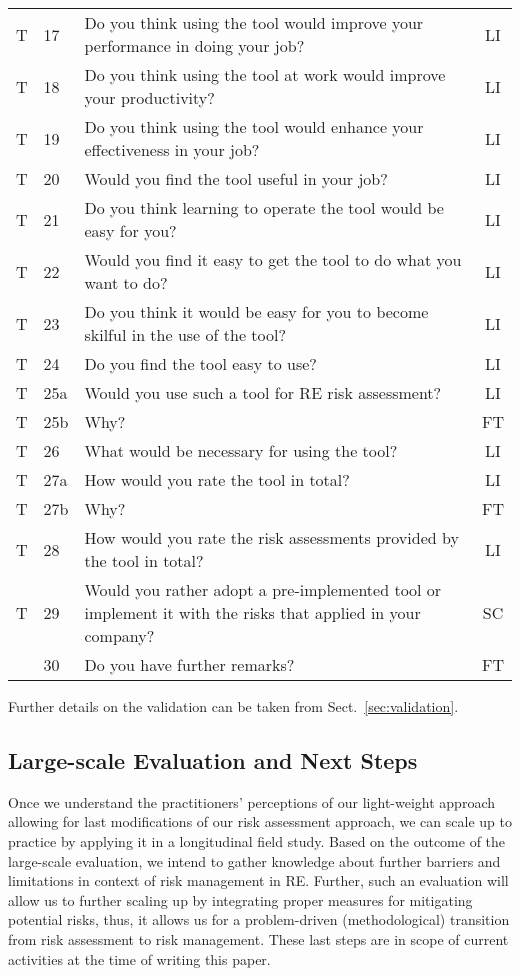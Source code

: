 \documentclass[lnbip]{svmultln}
\begin{document}
\begin{table}[htb]
\begin{tabular}{clp{10.4cm}c}
	T & 17 & Do you think using the tool would improve your performance in doing your job?  & LI  \\ 
	T & 18 & Do you think using the tool at work would improve your productivity? &  LI \\ 
	T & 19 & Do you think using the tool would enhance your effectiveness in your job? & LI  \\ 
	T & 20 & Would you find the tool useful in your job? & LI  \\ 
	T & 21 & Do you think learning to operate the tool would be easy for you?  & LI  \\ 
	T & 22 & Would you find it easy to get the tool to do what you want to do? &  LI \\ 
	T & 23 & Do you think it would be easy for you to become skilful in the use of the tool?  & LI  \\ 
	T & 24 & Do you find the tool easy to use? & LI  \\ 
	T & 25a & Would you use such a tool for RE risk assessment?  &  LI \\ 
	T & 25b & Why?  & FT  \\ 
	T & 26 & What would be necessary for using the tool?  & LI  \\ 
	T & 27a & How would you rate the tool in total?  &  LI \\ 
	T & 27b & Why?  & FT  \\ 
	T & 28 & How would you rate the risk assessments provided by the tool in total?   & LI  \\ 
	T & 29 & Would you rather adopt a pre-implemented tool or implement it with the risks that applied in your company?   & SC  \\ 
	 & 30 & Do you have further remarks?  &  FT \\ 
	\bottomrule
\end{tabular}
\end{table}
Further details on the validation can be taken from Sect.~\ref{sec:validation}.

\subsection{Large-scale Evaluation and Next Steps}
Once we understand the practitioners' perceptions of our light-weight approach allowing for last modifications of our risk assessment approach, we can scale up to practice by applying it in a longitudinal field study. Based on the outcome of the large-scale evaluation, we intend to gather knowledge about further barriers and limitations in context of risk management in RE. Further, such an evaluation will allow us to further scaling up by integrating proper measures for mitigating potential risks, thus, it allows us for a problem-driven (methodological) transition from risk assessment to risk management. These last steps are in scope of current activities at the time of writing this paper. 
\end{document}
